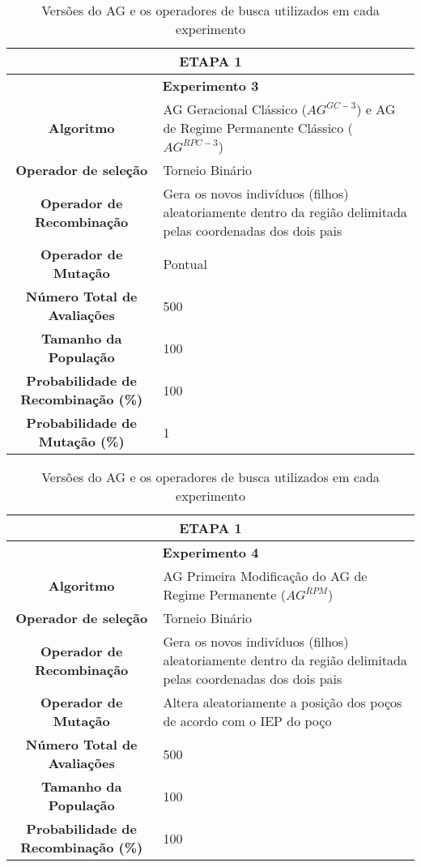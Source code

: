  \begin{table}[H]
\centering
\caption{Versões do AG e os operadores de busca utilizados em cada experimento}

 \begin{tabular}{|c|p{9cm}|}
\hline
 \multicolumn{2}{|c|}{ETAPA 1} \\ \hline
 \multicolumn{2}{|c|}{\textbf{Experimento 3}} \\ \hline
\textbf{Algoritmo} & AG Geracional Clássico ($AG^{GC-3}$) e AG de Regime Permanente Clássico ($AG^{RPC-3}$) \\ \hline
 \textbf{Operador de seleção} & Torneio Binário \\ \hline
 \textbf{Operador de Recombinação} & Gera os novos indivíduos (filhos) aleatoriamente dentro da região delimitada pelas coordenadas dos dois pais \\  \hline
 \textbf{Operador de Mutação} & Pontual \\ \hline
 \textbf{Número Total de Avaliações} & 500 \\ \hline
 \textbf{Tamanho da População} & 100 \\ \hline
 \textbf{Probabilidade de Recombinação (\%)} & 100 \\ \hline
 \textbf{Probabilidade de Mutação (\%)} & 1 \\ \hline 
  
\end{tabular}
\end{table}
 
 \begin{table}[H]
\centering
\caption{Versões do AG e os operadores de busca utilizados em cada experimento}

\begin{tabular}{|c|p{9cm}|}
 \hline
  \multicolumn{2}{|c|}{ETAPA 1} \\ \hline
  \multicolumn{2}{|c|}{\textbf{Experimento 4}} \\ \hline
\textbf{Algoritmo} & AG Primeira Modificação do AG de Regime Permanente ($AG^{RPM}$) \\ \hline
 \textbf{Operador de seleção} & Torneio Binário \\ \hline
 \textbf{Operador de Recombinação} & Gera os novos indivíduos (filhos) aleatoriamente dentro da região delimitada pelas coordenadas dos dois pais \\  \hline
 \textbf{Operador de Mutação} & Altera aleatoriamente a posição dos poços de acordo com o IEP do poço \\ \hline
 \textbf{Número Total de Avaliações} & 500 \\ \hline
 \textbf{Tamanho da População} & 100 \\ \hline
 \textbf{Probabilidade de Recombinação (\%)} & 100 \\ \hline
\end{tabular}
\end{table} 
 
